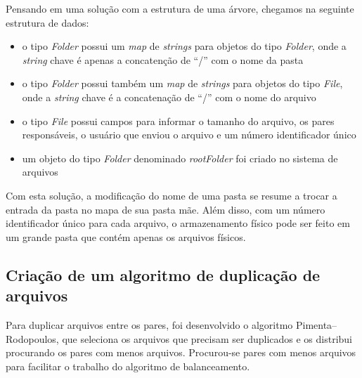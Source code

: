 \documentclass{article}
\begin{document}
Pensando em uma solução com a estrutura de uma árvore, chegamos na seguinte estrutura de dados:
\begin{itemize}
	\item o tipo \textit{Folder} possui um \textit{map} de \textit{strings} para objetos do tipo \textit{Folder}, onde a \textit{string} chave é apenas a concatenção de ``/'' com o nome da pasta
	\item o tipo \textit{Folder} possui também um \textit{map} de \textit{strings} para objetos do tipo \textit{File}, onde a \textit{string} chave é a concatenação de ``/'' com o nome do arquivo
	\item o tipo \textit{File} possui campos para informar o tamanho do arquivo, os pares responsáveis, o usuário que enviou o arquivo e um número identificador único
	\item um objeto do tipo \textit{Folder} denominado \textit{rootFolder} foi criado no sistema de arquivos
\end{itemize}

Com esta solução, a modificação do nome de uma pasta se resume a trocar a entrada da pasta no mapa de sua pasta mãe. Além disso, com um número identificador único para cada arquivo, o armazenamento físico pode ser feito em um grande pasta que contém apenas os arquivos físicos.

\subsection{Criação de um algoritmo de duplicação de arquivos}

\indent

Para duplicar arquivos entre os pares, foi desenvolvido o algoritmo Pimenta--Rodopoulos, que seleciona os arquivos que precisam ser duplicados e os distribui procurando os pares com menos arquivos. Procurou-se pares com menos arquivos para facilitar o trabalho do algoritmo de balanceamento.
\end{document}
